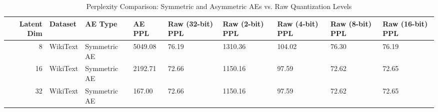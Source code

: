 \begin{table}
\caption{Perplexity Comparison: Symmetric and Asymmetric AEs vs. Raw Quantization Levels}
\label{tab:perplexity_comparison_all_quant}
\begin{tabular}{rllllllll}
\toprule
Latent Dim & Dataset & AE Type & AE PPL & Raw (32-bit) PPL & Raw (2-bit) PPL & Raw (4-bit) PPL & Raw (8-bit) PPL & Raw (16-bit) PPL \\
\midrule
8 & WikiText & Symmetric AE & 5049.08 & 76.19 & 1310.36 & 104.02 & 76.30 & 76.19 \\
16 & WikiText & Symmetric AE & 2192.71 & 72.66 & 1150.16 & 97.59 & 72.62 & 72.65 \\
32 & WikiText & Symmetric AE & 167.00 & 72.66 & 1150.16 & 97.59 & 72.62 & 72.65 \\
\bottomrule
\end{tabular}
\end{table}
